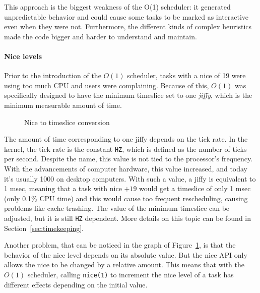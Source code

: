 This approach is the biggest weakness of the O(1) scheduler: it generated unpredictable behavior and could cause some tasks to be marked as interactive even when they were not. Furthermore, the different kinds of complex heuristics made the code bigger and harder to understand and maintain.

\paragraph{Nice levels} 
Prior to the introduction of the $O(1)$ scheduler, tasks with a nice of 19 were using too much CPU and users were complaining.\cite{nice_design} Because of this, $O(1)$ was specifically designed to have the minimum timeslice set to one \textit{jiffy}, which is the minimum measurable amount of time.  
\begin{figure}[t]
  \centering
  \caption{Nice to timeslice conversion}
  \label{fig:timeslice_vs_nice}
\end{figure}%
The amount of time corresponding to one jiffy depends on the tick
rate. In the kernel, the tick rate is the constant \verb|HZ|, which is defined as the number of ticks per second. Despite the name, this value is not tied to the processor's frequency. 
With the advancements of
computer hardware, this value increased, and today it's usually 1000 on desktop computers. With such a value, a jiffy is equivalent to 1 msec, meaning that a task with nice $+19$
would get a timeslice of only 1 msec (only 0.1\% CPU time) and this would cause too frequent
rescheduling, causing problems like cache trashing. The value of the
minimum timeslice can be adjusted, but it is still \verb|HZ| dependent. More
details on this topic can be found in Section~\ref{sec:timekeeping}.

Another problem, that can be noticed in the graph of
Figure~\ref{fig:timeslice_vs_nice}, is that the behavior of the nice
level depends on its absolute value. But the nice API only allows the nice to be changed by a relative amount. 
This means that with the $O(1)$ scheduler, calling \verb|nice(1)| to increment the nice level of a task has different effects depending on the initial value. 

